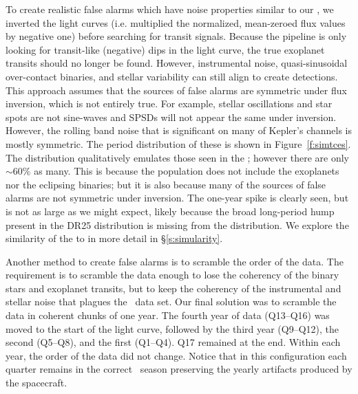To create realistic false alarms which have noise properties similar to our , we inverted the light curves (i.e. multiplied the normalized, mean-zeroed flux values by negative one) before searching for transit signals. Because the pipeline is only looking for transit-like (negative) dips in the light curve, the true exoplanet transits should no longer be found. However, instrumental noise, quasi-sinusoidal over-contact binaries, and stellar variability can still align to create detections. This approach assumes that the sources of false alarms are symmetric under flux inversion, which is not entirely true. For example, stellar oscillations and star spots are not sine-waves and SPSDs will not appear the same under inversion. However, the rolling band noise that is significant on many of Kepler's channels is mostly symmetric.  The period distribution of these  is shown in Figure~\ref{f:simtces}. The distribution qualitatively emulates those seen in the ; however there are only $\sim$60\% as many.  This is because the population does not include the exoplanets nor the eclipsing binaries; but it is also because many of the sources of false alarms are not symmetric under inversion.  The one-year spike is clearly seen, but is not as large as we might expect, likely because the broad long-period hump present in the DR25 \opstce{} distribution is missing from the \invtce{} distribution. We explore the similarity of the  to  in more detail in \S\ref{s:simularity}.

Another method to create false alarms is to scramble the order of the data. The requirement is to scramble the data enough to lose the coherency of the binary stars and exoplanet transits, but to keep the coherency of the instrumental and stellar noise that plagues the \Kepler\ data set. Our final solution was to scramble the data in coherent chunks of one year. The fourth year of data (Q13--Q16) was moved to the start of the light curve, followed by the third year (Q9--Q12), the second (Q5--Q8), and the first (Q1--Q4). Q17 remained at the end. Within each year, the order of the data did not change. Notice that in this configuration each quarter remains in the correct \Kepler\ season preserving the yearly artifacts produced by the spacecraft.


